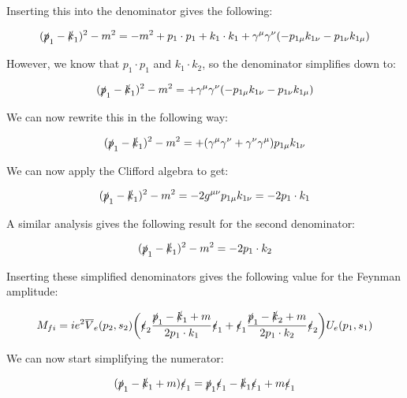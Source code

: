 \documentclass[a4]{article}
\begin{document}
    Inserting this into the denominator gives the following:

    \begin{equation}
        (\slashed{p}_1 - \slashed{k}_1)^2 - m^2 = - m^2 + p_1 \cdot p_1 + k_1 \cdot k_1 + \gamma^\mu \gamma^\nu (- p_{1 \mu} k_{1 \nu} - p_{1 \nu} k_{1 \mu})
    \end{equation}

    However, we know that $p_1 \cdot p_1$ and $k_1 \cdot k_2$, so the denominator simplifies down to:

    \begin{equation}
        (\slashed{p}_1 - \slashed{k}_1)^2 - m^2 = + \gamma^\mu \gamma^\nu (- p_{1 \mu} k_{1 \nu} - p_{1 \nu} k_{1 \mu})
    \end{equation}

    We can now rewrite this in the following way:

    \begin{equation}
        (\slashed{p}_1 - \slashed{k}_1)^2 - m^2 = + (\gamma^\mu \gamma^\nu + \gamma^\nu \gamma^\mu) p_{1 \mu} k_{1 \nu}
    \end{equation}

    We can now apply the Clifford algebra to get:

    \begin{equation}
        (\slashed{p}_1 - \slashed{k}_1)^2 - m^2 = - 2 g^{\mu \nu} p_{1 \mu} k_{1 \nu} = - 2 p_1 \cdot k_1
    \end{equation}

    A similar analysis gives the following result for the second denominator:

    \begin{equation}
        (\slashed{p}_1 - \slashed{k}_1)^2 - m^2 = - 2 p_1 \cdot k_2
    \end{equation}

    Inserting these simplified denominators gives the following value for the Feynman amplitude:

    \begin{equation}
        M_{fi} = i e^2 \overline{V}_e (p_2, s_2) \bigg( \slashed{\epsilon}_2 \frac{\slashed{p}_1 - \slashed{k}_1 + m}{2 p_1 \cdot k_1} \slashed{\epsilon}_1  + \slashed{\epsilon}_1 \frac{\slashed{p}_1 - \slashed{k}_2 + m}{2 p_1 \cdot k_2} \slashed{\epsilon}_2 \bigg) U_e (p_1, s_1)
    \end{equation}

    We can now start simplifying the numerator:

    \begin{equation}
        (\slashed{p}_1 - \slashed{k}_1 + m) \slashed{\epsilon}_1 = \slashed{p}_1 \slashed{\epsilon}_1 - \slashed{k}_1 \slashed{\epsilon}_1 + m \slashed{\epsilon}_1
    \end{equation}
\end{document}
